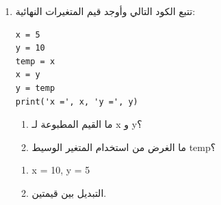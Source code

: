 \documentclass[14pt]{extarticle}
\begin{document}
\begin{enumerate}[itemsep=3em]
\ifwithsols
\begin{boxSolution}
\begin{enumerate}
    \item \textenglish{a = 40, b = 15}
    \item المتغير \textenglish{temp} يستخدم كمتغير وسيط لحفظ قيمة \textenglish{a} قبل تغييرها، لكي نتمكن من إعطائها لـ \textenglish{b} لاحقاً، وبذلك تكتمل عملية التبديل (\textenglish{swap}).
\end{enumerate}
\end{boxSolution}
\fi

\item
تتبع الكود التالي وأوجد قيم المتغيرات النهائية:
\begin{boxCode}
\begin{english}
\begin{verbatim}
x = 5
y = 10
temp = x
x = y
y = temp
print('x =', x, 'y =', y)
\end{verbatim}
\end{english}
\end{boxCode}
\begin{enumerate}
    \item ما القيم المطبوعة لـ \textenglish{x} و \textenglish{y}؟
    \item ما الغرض من استخدام المتغير الوسيط \textenglish{temp}؟
\end{enumerate}

\ifwithsols
\begin{boxSolution}
\begin{enumerate}
    \item \textenglish{x = 10, y = 5}
    \item التبديل بين قيمتين.
\end{enumerate}
\end{boxSolution}
\fi

\end{enumerate}
\clearpage
\end{document}
